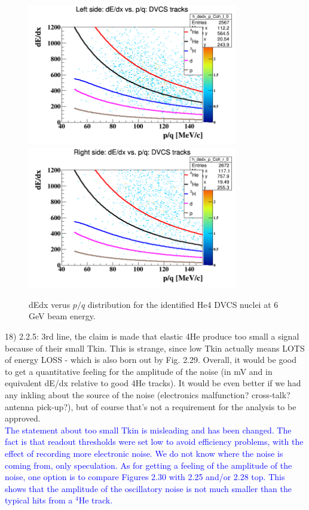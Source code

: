 \begin{figure}[tbp]
\hspace{-0.1cm}
\includegraphics[height=6.2cm]{fig/dedx_p_Coh_l_dvcs.png}
\includegraphics[height=6.2cm]{fig/dedx_p_Coh_r_dvcs.png}
\caption{dEdx verus $p/q$ distribution for the identified He4 DVCS nuclei at 6 
GeV beam energy.}
\label{fig:dedx_dvcs_6gev}
\end{figure}


18) 2.2.5: 3rd line, the claim is made that elastic 4He produce too small a 
signal because of their small Tkin. This is strange, since low Tkin actually 
means LOTS of energy LOSS - which is also born out by Fig. 2.29. Overall, it 
would be good to get a quantitative feeling for the amplitude of the noise (in 
mV and in equivalent dE/dx relative to good 4He tracks). It would be even 
better if we had any inkling about the source of the noise (electronics 
malfunction? cross-talk? antenna pick-up?), but of course that's not a 
requirement for the analysis to be approved. \\
\textcolor{blue}{
The statement about too small Tkin is misleading and has been changed.
The fact is that readout thresholds were set low to avoid efficiency problems,
with the effect of recording more electronic noise. We do not know where the noise is
coming from, only speculation. As for getting a feeling of the
amplitude of the noise, one option is to compare Figures 2.30 with 2.25 and/or
2.28 top. This shows that the amplitude of the oscillatory noise is not much
smaller than the typical hits from a $^4$He track.}\\
    

